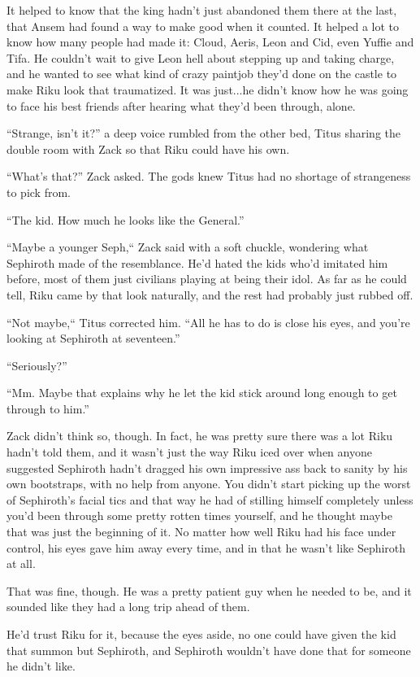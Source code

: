 It helped to know that the king hadn't just abandoned them there at the last, that Ansem had found a way to make good when it counted. It helped a lot to know how many people had made it: Cloud, Aeris, Leon and Cid, even Yuffie and Tifa. He couldn't wait to give Leon hell about stepping up and taking charge, and he wanted to see what kind of crazy paintjob they'd done on the castle to make Riku look that traumatized. It was just...he didn't know how he was going to face his best friends after hearing what they'd been through, alone.

``Strange, isn't it?'' a deep voice rumbled from the other bed, Titus sharing the double room with Zack so that Riku could have his own.

``What's that?'' Zack asked. The gods knew Titus had no shortage of strangeness to pick from.

``The kid. How much he looks like the General.''

``Maybe a younger Seph,`` Zack said with a soft chuckle, wondering what Sephiroth made of the resemblance. He'd hated the kids who'd imitated him before, most of them just civilians playing at being their idol. As far as he could tell, Riku came by that look naturally, and the rest had probably just rubbed off.

``Not maybe,`` Titus corrected him. ``All he has to do is close his eyes, and you're looking at Sephiroth at seventeen.''

``Seriously?''

``Mm. Maybe that explains why he let the kid stick around long enough to get through to him.''

Zack didn't think so, though. In fact, he was pretty sure there was a lot Riku hadn't told them, and it wasn't just the way Riku iced over when anyone suggested Sephiroth hadn't dragged his own impressive ass back to sanity by his own bootstraps, with no help from anyone. You didn't start picking up the worst of Sephiroth's facial tics and that way he had of stilling himself completely unless you'd been through some pretty rotten times yourself, and he thought maybe that was just the beginning of it. No matter how well Riku had his face under control, his eyes gave him away every time, and in that he wasn't like Sephiroth at all.

That was fine, though. He was a pretty patient guy when he needed to be, and it sounded like they had a long trip ahead of them.

He'd trust Riku for it, because the eyes aside, no one could have given the kid that summon but Sephiroth, and Sephiroth wouldn't have done that for someone he didn't like.

